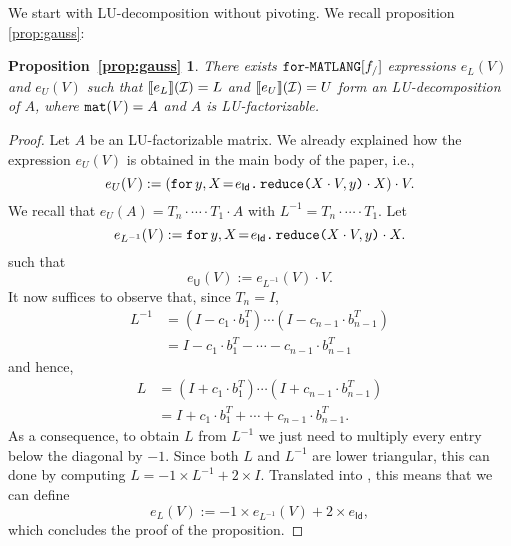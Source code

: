 \newtheorem*{ALU}{Proposition~\ref{prop:gauss}}

We start with LU-decomposition without pivoting. We recall proposition \ref{prop:gauss}:
\begin{ALU}
  There exists $\langforf{f_/}$ expressions $e_L(V)$ and $e_U(V)$ such that
  $\sem{e_L}{\I}=L$ and $\sem{e_U}{\I}=U$ form an LU-decomposition of $A$,
  where $\conc(V)=A$ and $A$ is LU-factorizable.
\end{ALU}
\begin{proof}
	Let $A$ be an LU-factorizable matrix. We already explained how the expression 
	$e_U(V)$ is obtained in the main body of the paper, i.e., 
	$$
	e_{U}(V) :=  \left( \initf{e_{\mathsf{Id}}}{y}{X}{\red{X\cdot V}{y}\cdot X} \right) \cdot V.
	$$
	We recall that $e_U(A)=T_n\cdot\cdots\cdot T_1\cdot A$ with $L^{-1}=T_n\cdot\cdots\cdot T_1$. Let
	$$
	e_{L^{-1}}(V) :=  \initf{e_{\mathsf{Id}}}{y}{X}{\red{X\cdot V}{y}\cdot X}.
	$$
such that	$$
	e_{\mathsf{U}}(V) :=  e_{L^{-1}}(V) \cdot V.
	$$
%
%
It now suffices to observe that, since $T_n=I$,
\begin{align*}
  L^{-1}&=(I-c_1\cdot b_1^T)\cdots (I-c_{n-1}\cdot  b_{n-1}^T) \\
  &=I-c_1\cdot b_1^T-\cdots - c_{n-1}\cdot b_{n-1}^T
\end{align*}
and hence,
\begin{align*}
  L&=(I+c_1\cdot b_1^T)\cdots (I+c_{n-1}\cdot b_{n-1}^T) \\
  &=I+c_1\cdot b_1^T+\cdots + c_{n-1}\cdot b_{n-1}^T.
\end{align*}
As a consequence, to obtain $L$ from $L^{-1}$ we just need to multiply every entry below the diagonal by $-1$. Since both  $L$ and $L^{-1}$ are lower triangular, this can done 
by computing $L=-1\times L^{-1} + 2\times I$. Translated into \langfor, this means that we can define
$$
e_{L}(V) :=  -1\times e_{L^{-1}}(V) + 2\times e_{\mathsf{Id}},
$$
which concludes the proof of the proposition.
\end{proof}
